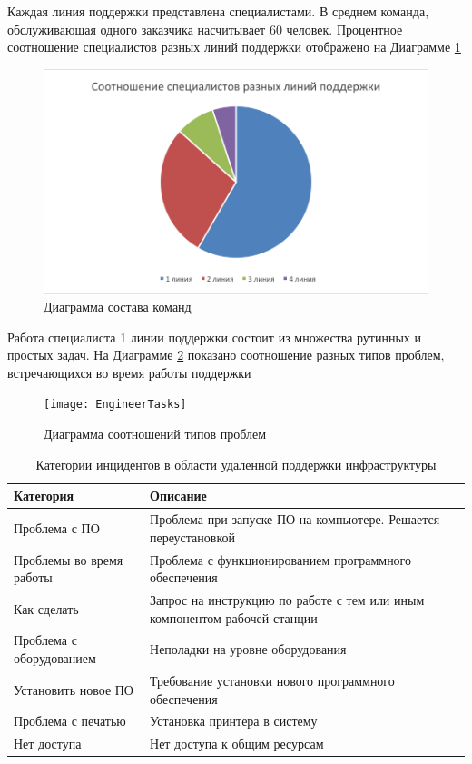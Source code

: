 Каждая линия поддержки представлена специалистами. В среднем команда, обслуживающая одного заказчика насчитывает 60 человек. Процентное соотношение специалистов разных линий поддержки отображено на Диаграмме \ref{img:ITSMTeamComposition}

\begin{figure} [h] 
  \center
  \includegraphics [scale=0.7] {ITSMTeamComposition}
  \caption{Диаграмма состава команд} 
  \label{img:ITSMTeamComposition}  
\end{figure}

Работа специалиста 1 линии поддержки состоит из множества рутинных и простых задач. На Диаграмме \ref{img:EngineerTasks}  показано соотношение разных типов проблем, встречающихся во время работы поддержки

\begin{figure} [h] 
  \center
  \texttt{[image: EngineerTasks]}
  \caption{Диаграмма соотношений типов проблем} 
  \label{img:EngineerTasks}  
\end{figure}

\begin{table} [htbp]
  \centering
  \parbox{15cm}{\caption{Категории инцидентов в области удаленной поддержки инфраструктуры}\label{IncidentDescription}}
  \begin{tabular}{| p{7cm} || p{7cm} |}
  \hline
  \hline
Категория & Описание \\
  \hline
Проблема с ПО	& Проблема при запуске ПО на компьютере. Решается переустановкой \\
Проблемы во время работы  & Проблема с функционированием программного обеспечения\\
Как сделать & Запрос на инструкцию по работе с тем или иным компонентом рабочей станции \\
Проблема с оборудованием  & Неполадки на уровне оборудования \\
Установить новое ПО       & Требование установки нового программного обеспечения \\
Проблема с печатью        & Установка принтера в систему \\
Нет доступа               & Нет доступа к общим ресурсам \\
  \hline
  \hline
  \end{tabular}
\end{table}

